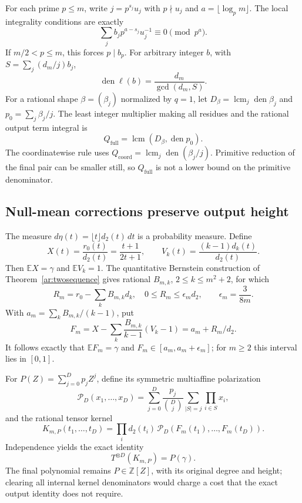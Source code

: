 \documentclass[11pt,a4paper]{article}
\newcommand{\Z}{\mathbb Z}
\theoremstyle{definition}
\theoremstyle{remark}
\numberwithin{equation}{section}
\begin{document}
For each prime $p\le m$, write $j=p^{s_j}u_j$ with $p\nmid u_j$ and $a=\lfloor\log_pm\rfloor$. The local integrality conditions are exactly
\[
 \sum_jb_jp^{a-s_j}u_j^{-1}\equiv0\pmod{p^a}.
\]
If $m/2<p\le m$, this forces $p\mid b_p$. For arbitrary integer $b$, with $S=\sum_j(d_m/j)b_j$,
\[
 \operatorname{den}\ell(b)=\frac{d_m}{\gcd(d_m,S)}.
\]
For a rational shape $\beta=(\beta_j)$ normalized by $q=1$, let $D_\beta=\operatorname{lcm}_j\operatorname{den}\beta_j$ and $p_0=\sum_j\beta_j/j$. The least integer multiplier making all residues and the rational output term integral is
\[
 Q_{\mathrm{full}}=\operatorname{lcm}(D_\beta,\operatorname{den}p_0).
\]
The coordinatewise rule uses $Q_{\mathrm{coord}}=\operatorname{lcm}_j\operatorname{den}(\beta_j/j)$. Primitive reduction of the final pair can be smaller still, so $Q_{\mathrm{full}}$ is not a lower bound on the primitive denominator.

\subsection{Null-mean corrections preserve output height}
\label{inf:sub:positive-lift}
The measure $d\eta(t)=\lfloor t\rfloor d_2(t)\,dt$ is a probability measure. Define
\[
 X(t)=\frac{r_0(t)}{d_2(t)}=\frac{t+1}{2t+1},\qquad
 V_k(t)=\frac{(k-1)d_k(t)}{d_2(t)}.
\]
Then $\mathbb EX=\gamma$ and $\mathbb EV_k=1$. The quantitative Bernstein construction of Theorem~\ref{ar:twosequence} gives rational $B_{m,k}$, $2\le k\le m^2+2$, for which
\[
 R_m=r_0-\sum_kB_{m,k}d_k,\quad
 0\le R_m\le\epsilon_md_2,\qquad\epsilon_m=\frac3{8m}.
\]
With $a_m=\sum_kB_{m,k}/(k-1)$, put
\[
 F_m=X-\sum_k\frac{B_{m,k}}{k-1}(V_k-1)
     =a_m+R_m/d_2.
\]
It follows exactly that $\mathbb EF_m=\gamma$ and $F_m\in[a_m,a_m+\epsilon_m]$; for $m\ge2$ this interval lies in $[0,1]$.

For $P(Z)=\sum_{j=0}^Dp_jZ^j$, define its symmetric multiaffine polarization
\[
 \mathcal P_D(x_1,\ldots,x_D)=\sum_{j=0}^D\frac{p_j}{\binom Dj}
      \sum_{|S|=j}\prod_{i\in S}x_i,
\]
and the rational tensor kernel
\[
 K_{m,P}(t_1,\ldots,t_D)=\prod_id_2(t_i)\,
                  \mathcal P_D(F_m(t_1),\ldots,F_m(t_D)).
\]
Independence yields the exact identity
\begin{equation}\label{inf:eq:positive-output}
 T^{\otimes D}(K_{m,P})=P(\gamma).
\end{equation}
The final polynomial remains $P\in\Z[Z]$, with its original degree and height; clearing all internal kernel denominators would charge a cost that the exact output identity does not require.
\end{document}
